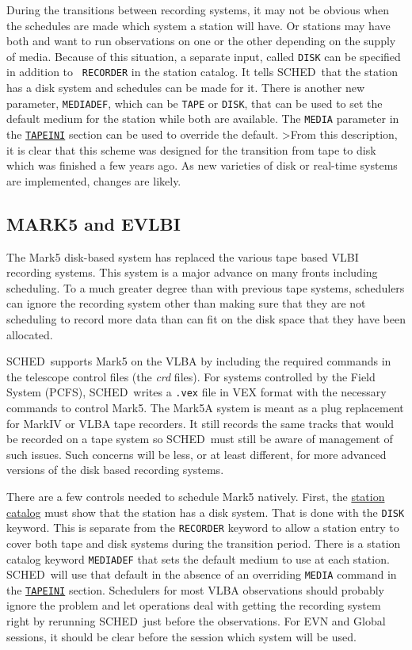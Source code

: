 \documentclass{report}
\newcommand{\schedb}{{\sc SCHED~}}
\begin{document}
During the transitions between recording systems, it may not be
obvious when the schedules are made which system a station will have.
Or stations may have both and want to run observations on one or the
other depending on the supply of media.  Because of this situation, a
separate input, called {\tt DISK} can be specified in addition to {\tt
RECORDER} in the station catalog.  It tells \schedb that the station
has a disk system and schedules can be made for it.  There is another
new parameter, {\tt MEDIADEF}, which can be {\tt TAPE} or {\tt DISK},
that can be used to set the default medium for the station while both
are available.  The {\tt MEDIA} parameter in the 
{\hyperref[MP:TAPEINI]{{\tt TAPEINI}}}
section can be used to override the default.
>From this description, it is clear that this scheme was designed for
the transition from tape to disk which was finished a few years ago.
As new varieties of disk or real-time systems are implemented, changes
are likely.

\subsection{\label{SSEC:MK5}MARK5 and EVLBI}

The Mark5 disk-based system has replaced the various tape based VLBI
recording systems.  This system is a major advance on many fronts
including scheduling.  To a much greater degree than with previous
tape systems, schedulers can ignore the recording system other than
making sure that they are not scheduling to record more data than can
fit on the disk space that they have been allocated.

\schedb supports Mark5 on the VLBA by including the required commands
in the telescope control files (the {\sl crd} files).  For systems
controlled by the Field System (PCFS), \schedb writes a {\tt .vex} file
in VEX format with the necessary commands to control Mark5.  The Mark5A
system is meant as a plug replacement for MarkIV or VLBA tape recorders.
It still records the same tracks that would be recorded on a tape
system so \schedb must still be aware of management of such issues.
Such concerns will be less, or at least different, for more advanced
versions of the disk based recording systems.

There are a few controls needed to schedule Mark5 natively.  First,
the 
{\hyperref[SEC:STACAT]{station catalog}} must show that the station
has a disk system.  That is done with the {\tt DISK} keyword.  This is
separate from the {\tt RECORDER} keyword to allow a station entry to
cover both tape and disk systems during the transition period.  There
is a station catalog keyword {\tt MEDIADEF} that sets the default
medium to use at each station.  \schedb will use that default in the
absence of an overriding {\tt MEDIA} command in the 
{\hyperref[MP:TAPEINI]{{\tt TAPEINI}}} section.
Schedulers for most VLBA observations
should probably ignore the problem and let operations deal with
getting the recording system right by rerunning \schedb just before
the observations.  For EVN and Global sessions, it should be clear
before the session which system will be used.
\end{document}
